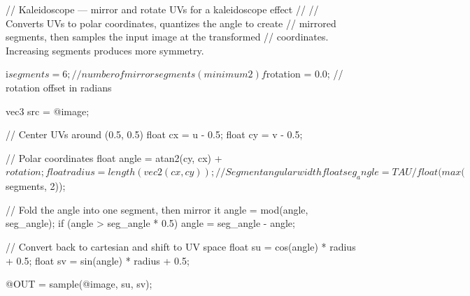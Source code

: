 // Kaleidoscope — mirror and rotate UVs for a kaleidoscope effect
//
// Converts UVs to polar coordinates, quantizes the angle to create
// mirrored segments, then samples the input image at the transformed
// coordinates. Increasing segments produces more symmetry.

i$segments = 6;        // number of mirror segments (minimum 2)
f$rotation = 0.0;      // rotation offset in radians

vec3 src = @image;

// Center UVs around (0.5, 0.5)
float cx = u - 0.5;
float cy = v - 0.5;

// Polar coordinates
float angle = atan2(cy, cx) + $rotation;
float radius = length(vec2(cx, cy));

// Segment angular width
float seg_angle = TAU / float(max($segments, 2));

// Fold the angle into one segment, then mirror it
angle = mod(angle, seg_angle);
if (angle > seg_angle * 0.5) {
    angle = seg_angle - angle;
}

// Convert back to cartesian and shift to UV space
float su = cos(angle) * radius + 0.5;
float sv = sin(angle) * radius + 0.5;

@OUT = sample(@image, su, sv);
